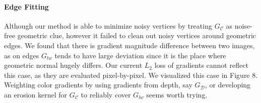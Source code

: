 \paragraph{Edge Fitting}
Although our method is able to minimize noisy vertices by treating $G_\mathcal{C}$ as noise-free geometric clue, however it failed to clean out noisy vertices around geometric edges. 
We found that there is gradient magnitude difference between two images, as on edges $G_{lw}$ tends to have large deviation since it is the place where geometric normal hugely differs. 
Our current $L_2$ loss of gradients cannot reflect this case, as they are evaluated pixel-by-pixel. 
We visualized this case in Figure 8. 
Weighting color gradients by using gradients from depth, say $G_\mathcal{D}$, or developing an erosion kernel for $G_\mathcal{C}$ to reliably cover $G_{lw}$ seems worth trying.

